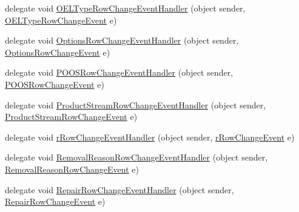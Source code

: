 \begin{DoxyCompactItemize}
delegate void \hyperlink{class_env_int_1_1_win32_1_1_field_tech_1_1_manager_1_1_data_sets_1_1_guide_ware_mobile_data_set_a7b6f6097dcc632687fa93021de48da64}{O\+E\+L\+Type\+Row\+Change\+Event\+Handler} (object sender, \hyperlink{class_env_int_1_1_win32_1_1_field_tech_1_1_manager_1_1_data_sets_1_1_guide_ware_mobile_data_set_1_1_o_e_l_type_row_change_event}{O\+E\+L\+Type\+Row\+Change\+Event} e)
\item 
delegate void \hyperlink{class_env_int_1_1_win32_1_1_field_tech_1_1_manager_1_1_data_sets_1_1_guide_ware_mobile_data_set_a1f280d1d79852f0a6b8d9fe599e484d8}{Options\+Row\+Change\+Event\+Handler} (object sender, \hyperlink{class_env_int_1_1_win32_1_1_field_tech_1_1_manager_1_1_data_sets_1_1_guide_ware_mobile_data_set_1_1_options_row_change_event}{Options\+Row\+Change\+Event} e)
\item 
delegate void \hyperlink{class_env_int_1_1_win32_1_1_field_tech_1_1_manager_1_1_data_sets_1_1_guide_ware_mobile_data_set_a7bd082e708384fdec8592f2c19ce7174}{P\+O\+O\+S\+Row\+Change\+Event\+Handler} (object sender, \hyperlink{class_env_int_1_1_win32_1_1_field_tech_1_1_manager_1_1_data_sets_1_1_guide_ware_mobile_data_set_1_1_p_o_o_s_row_change_event}{P\+O\+O\+S\+Row\+Change\+Event} e)
\item 
delegate void \hyperlink{class_env_int_1_1_win32_1_1_field_tech_1_1_manager_1_1_data_sets_1_1_guide_ware_mobile_data_set_ad25fd90b16b6b963a1d750a75c2e32a3}{Product\+Stream\+Row\+Change\+Event\+Handler} (object sender, \hyperlink{class_env_int_1_1_win32_1_1_field_tech_1_1_manager_1_1_data_sets_1_1_guide_ware_mobile_data_set_6d119e1ef5d2632a57332691de4d53e9}{Product\+Stream\+Row\+Change\+Event} e)
\item 
delegate void \hyperlink{class_env_int_1_1_win32_1_1_field_tech_1_1_manager_1_1_data_sets_1_1_guide_ware_mobile_data_set_a827f75a235c1aff22fb429089a4ebdb5}{r\+Row\+Change\+Event\+Handler} (object sender, \hyperlink{class_env_int_1_1_win32_1_1_field_tech_1_1_manager_1_1_data_sets_1_1_guide_ware_mobile_data_set_1_1r_row_change_event}{r\+Row\+Change\+Event} e)
\item 
delegate void \hyperlink{class_env_int_1_1_win32_1_1_field_tech_1_1_manager_1_1_data_sets_1_1_guide_ware_mobile_data_set_a9e8d3bdd1299c308c92a189d287e41cc}{Removal\+Reason\+Row\+Change\+Event\+Handler} (object sender, \hyperlink{class_env_int_1_1_win32_1_1_field_tech_1_1_manager_1_1_data_sets_1_1_guide_ware_mobile_data_set_deb38dea927d9374a60c90d1719a477f}{Removal\+Reason\+Row\+Change\+Event} e)
\item 
delegate void \hyperlink{class_env_int_1_1_win32_1_1_field_tech_1_1_manager_1_1_data_sets_1_1_guide_ware_mobile_data_set_a5a18a00a70efa6bcaef5991835432d89}{Repair\+Row\+Change\+Event\+Handler} (object sender, \hyperlink{class_env_int_1_1_win32_1_1_field_tech_1_1_manager_1_1_data_sets_1_1_guide_ware_mobile_data_set_1_1_repair_row_change_event}{Repair\+Row\+Change\+Event} e)

\end{DoxyCompactItemize}
